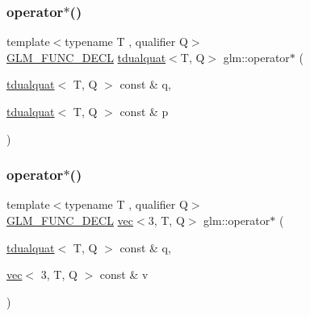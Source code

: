\mbox{\label{group__gtx__dual__quaternion_ga01828eee9e1cf1f56e4018fcdc910aa0}} 
\subsubsection{\texorpdfstring{operator$\ast$()}{operator*()}\hspace{0.1cm}{\footnotesize\ttfamily [1/7]}}
{\footnotesize\ttfamily template$<$typename T , qualifier Q$>$ \\
\hyperlink{setup_8hpp_ab2d052de21a70539923e9bcbf6e83a51}{G\+L\+M\+\_\+\+F\+U\+N\+C\+\_\+\+D\+E\+CL} \hyperlink{structglm_1_1tdualquat}{tdualquat}$<$T, Q$>$ glm\+::operator$\ast$ (\begin{DoxyParamCaption}\item[{\hyperlink{structglm_1_1tdualquat}{tdualquat}$<$ T, Q $>$ const \&}]{q,  }\item[{\hyperlink{structglm_1_1tdualquat}{tdualquat}$<$ T, Q $>$ const \&}]{p }\end{DoxyParamCaption})}

\mbox{\label{group__gtx__dual__quaternion_ga3489c5fcf23fd302ef3713f443585cbd}} 
\subsubsection{\texorpdfstring{operator$\ast$()}{operator*()}\hspace{0.1cm}{\footnotesize\ttfamily [2/7]}}
{\footnotesize\ttfamily template$<$typename T , qualifier Q$>$ \\
\hyperlink{setup_8hpp_ab2d052de21a70539923e9bcbf6e83a51}{G\+L\+M\+\_\+\+F\+U\+N\+C\+\_\+\+D\+E\+CL} \hyperlink{structglm_1_1vec}{vec}$<$3, T, Q$>$ glm\+::operator$\ast$ (\begin{DoxyParamCaption}\item[{\hyperlink{structglm_1_1tdualquat}{tdualquat}$<$ T, Q $>$ const \&}]{q,  }\item[{\hyperlink{structglm_1_1vec}{vec}$<$ 3, T, Q $>$ const \&}]{v }\end{DoxyParamCaption})}


